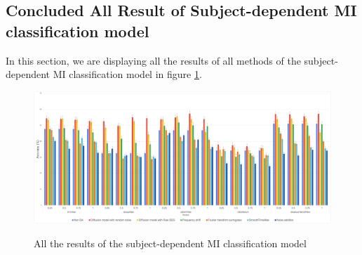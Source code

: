\subsection{Concluded All Result of Subject-dependent MI classification model}

In this section, we are displaying all the results of all methods of the subject-dependent MI classification model in figure \ref{fig:All the results of the subject-dependent MI classification model}.

\begin{figure}[ht]
  \centering
  \caption[All the results of the subject-dependent MI classification model]{All the results of the subject-dependent MI classification model}
  \includegraphics[width=1.1\textwidth]{fig/Con.png}
  \label{fig:All the results of the subject-dependent MI classification model}
\end{figure}


